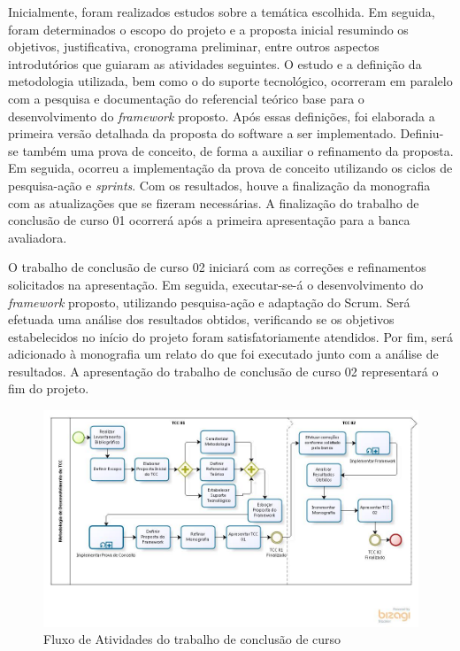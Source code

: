  \par
 \indent Inicialmente, foram realizados estudos sobre a temática escolhida. Em seguida, foram determinados o escopo do projeto e a proposta inicial resumindo os objetivos, justificativa, cronograma preliminar, entre outros aspectos introdutórios que guiaram as atividades seguintes. O estudo e a definição  da metodologia utilizada, bem como o do suporte tecnológico, ocorreram em paralelo com a pesquisa e documentação do referencial teórico base para o desenvolvimento do \textit{framework} proposto. Após essas definições, foi elaborada a primeira versão detalhada da proposta do software a ser implementado. Definiu-se também uma prova de conceito, de forma a auxiliar o refinamento da proposta. Em seguida, ocorreu a implementação da prova de conceito utilizando os ciclos de pesquisa-ação e \textit{sprints}. Com os resultados, houve a finalização da monografia com as atualizações que se fizeram necessárias. A finalização do trabalho de conclusão de curso 01 ocorrerá após a primeira apresentação para a banca avaliadora.
 \par
 \indent O trabalho de conclusão de curso 02 iniciará com as correções e refinamentos solicitados na apresentação. Em seguida,  executar-se-á o desenvolvimento do \textit{framework} proposto, utilizando pesquisa-ação e adaptação do Scrum. Será efetuada uma análise dos resultados obtidos, verificando se os objetivos estabelecidos no início do projeto foram satisfatoriamente atendidos. Por fim, será adicionado à monografia um relato do que foi executado junto com a análise de resultados.  A apresentação do trabalho de conclusão de curso 02 representará o fim do projeto.
 	
  \begin{figure}[h]
    \centering
    \includegraphics[width=\textwidth]{figuras/processo.jpg}
    \caption{Fluxo de Atividades do trabalho de conclusão de curso}
    \label{fig:processo}
  \end{figure}

